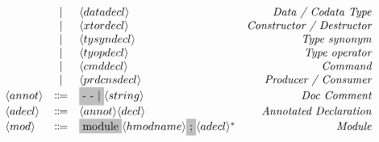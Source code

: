 \[\begin{array}{lclr}
    & | & \nonterminal{datadecl} & \emph{Data / Codata Type} \\
    & | & \nonterminal{xtordecl} & \emph{Constructor / Destructor} \\
    & | & \nonterminal{tysyndecl} & \emph{Type synonym} \\
    & | & \nonterminal{tyopdecl} & \emph{Type operator} \\
    & | & \nonterminal{cmddecl} & \emph{Command} \\
    & | & \nonterminal{prdcnsdecl} & \emph{Producer / Consumer} \\
    \nonterminal{annot} & \Coloneqq & \terminal{- - $|$} \nonterminal{string} & \emph{Doc Comment} \\
    \nonterminal{adecl} & \Coloneqq & \nonterminal{annot}\nonterminal{decl} & \emph{Annotated Declaration} \\
    \nonterminal{mod} & \Coloneqq & \terminal{module} \nonterminal{hmodname} \terminal{;} \nonterminal{adecl}^{\ast}& \emph{Module}
  \end{array}
\]
